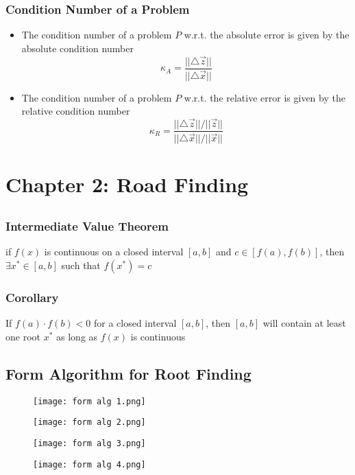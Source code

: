 \documentclass[11pt]{article}
\newcommand{\tri}{\triangle}
\begin{document}
\subsubsection{Condition Number of a Problem}
\begin{itemize}
  \item The condition number of a problem $P$ w.r.t. the absolute error is given by the absolute condition number \[\kappa_A = \frac{||\tri\vec{z}||}{||\tri\vec{x}||}\]
  \item The condition number of a problem $P$ w.r.t. the relative error is given by the relative condition number \[\kappa_R = \frac{||\tri\vec{z}||/||\vec{z}||}{||\tri\vec{x}||/||\vec{x}||}\]
\end{itemize}

\section{Chapter 2: Road Finding}
\subsection{}
\subsubsection{Intermediate Value Theorem}
if $f(x)$ is continuous on a closed interval $[a,b]$ and $c\in[f(a),f(b)]$, then $\exists x^*\in[a,b]$ such that $f(x^*) = c$
\subsubsection{Corollary}
If $f(a)\cdot f(b)<0$ for a closed interval $[a,b]$, then $[a,b]$ will contain at least one root $x^*$ as long as $f(x)$ is continuous 
\subsection{Form Algorithm for Root Finding}
\begin{figure}[tbhp]
	\begin{center}
		\texttt{[image: form alg 1.png]}
	\end{center}
	\label{figcaption}
\end{figure}
\begin{figure}[tbhp]
	\begin{center}
		\texttt{[image: form alg 2.png]}
	\end{center}
	\label{figcaption}
\end{figure}
\begin{figure}[tbhp]
	\begin{center}
		\texttt{[image: form alg 3.png]}
	\end{center}
	\label{figcaption}
\end{figure}
\begin{figure}[tbhp]
	\begin{center}
		\texttt{[image: form alg 4.png]}
	\end{center}
	\label{figcaption}
\end{figure}
\newpage 
\end{document}
